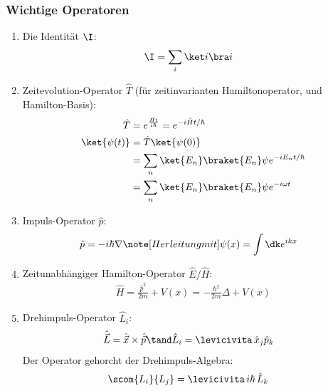 \documentclass[twocolumn, unnumberedsubsub]{summery_5.0} %
\begin{document}
\subsubsection{Wichtige Operatoren}
\begin{enumerate}
    \item Die Identität \(\I\):
    \begin{align*}
        \I &= \sum_i \ket i \bra i 
    \end{align*}
    
    \item Zeitevolution-Operator \(\hat T\) (für zeitinvarianten Hamiltonoperator, und Hamilton-Basis):
    \begin{align*}
        \hat T &= e^{\frac{\hat H t}{i \hbar}} = e^{-i\hat H t/\hbar}\\
        \ket{\psi(t)} &= \hat T \ket {\psi(0)}\\
        &= \sum_n \ket {E_n} \braket {{E_n}}\psi e^{-i E_n t/\hbar}\\
        &= \sum_n \ket {E_n} \braket {E_n}\psi e^{-i \omega t} 
    \end{align*}
    
    \item Impuls-Operator \(\hat p\):
    \begin{align*}
        \hat p &= -i\hbar \nabla \note[Herleitung mit ] \psi(x) = \int\dk e^{i k x}
    \end{align*}
    
    \item Zeitunabhängiger Hamilton-Operator \(\hat E/\hat H\):
    \begin{align*}
        \hat H = \frac{\hat p^2}{2m} + V(x)
        = -\frac{\hbar^2}{2m} \Delta + V(x)
    \end{align*}
    
    \item Drehimpuls-Operator \(\hat L_i\):
    \begin{align*}
        \hat {\vec L} &= \hat {\vec x} \times  \hat {\vec p} \tand
        \hat L_i = \levicivita\, \hat x_j  \hat p_k
    \end{align*}
    Der Operator gehorcht der Drehimpuls-Algebra:
    \begin{align*}
        \scom{L_i}{L_j} &= \levicivita \,i\hbar\, \hat L_k
    \end{align*}
    

\end{enumerate}
\end{document}

